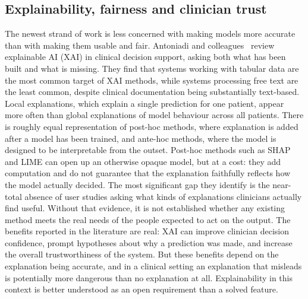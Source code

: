 \documentclass[11pt]{article}
\begin{document}
\subsection{Explainability, fairness and clinician trust}

The newest strand of work is less concerned with making models more accurate than with making them usable and fair. Antoniadi and colleagues~\cite{Antoniadi} review explainable AI (XAI) in clinical decision support, asking both what has been built and what is missing. They find that systems working with tabular data are the most common target of XAI methods, while systems processing free text are the least common, despite clinical documentation being substantially text-based. Local explanations, which explain a single prediction for one patient, appear more often than global explanations of model behaviour across all patients. There is roughly equal representation of post-hoc methods, where explanation is added after a model has been trained, and ante-hoc methods, where the model is designed to be interpretable from the outset. Post-hoc methods such as SHAP and LIME can open up an otherwise opaque model, but at a cost: they add computation and do not guarantee that the explanation faithfully reflects how the model actually decided. The most significant gap they identify is the near-total absence of user studies asking what kinds of explanations clinicians actually find useful. Without that evidence, it is not established whether any existing method meets the real needs of the people expected to act on the output. The benefits reported in the literature are real: XAI can improve clinician decision confidence, prompt hypotheses about why a prediction was made, and increase the overall trustworthiness of the system. But these benefits depend on the explanation being accurate, and in a clinical setting an explanation that misleads is potentially more dangerous than no explanation at all. Explainability in this context is better understood as an open requirement than a solved feature.
\end{document}
